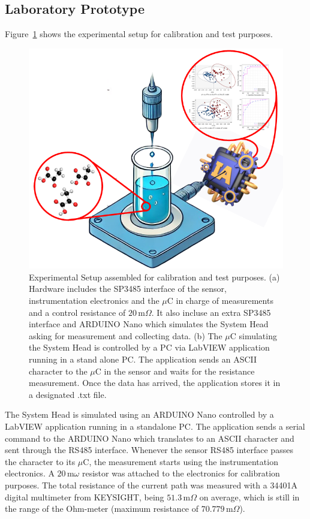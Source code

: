 \documentclass[journal,twoside,web]{ieeecolor}
\begin{document}
\subsection{Laboratory Prototype}
\label{ssec:labProto}
Figure~\ref{fig:measSet} shows the experimental setup for calibration and test purposes.
\begin{figure}
\centering
\includegraphics [trim = 0mm 50mm 0mm 0mm, clip, width=1\textwidth]{figures/fig0.png}
\caption{Experimental Setup assembled for calibration and test purposes. (a) Hardware includes the SP3485 interface of the sensor, instrumentation electronics and the $\mu$C in charge of measurements and a control resistance of $20$\,m$\Omega$. It also incluse an extra SP3485 interface and ARDUINO Nano which simulates the System Head asking for measurement and collecting data. (b) The $\mu$C simulating the System Head is controlled by a PC via LabVIEW application running in a stand alone PC. The application sends an ASCII character to the $\mu$C in the sensor and waits for the resistance measurement. Once the data has arrived, the application stores it in a designated .txt file.}
\label{fig:measSet}
\end{figure}
The System Head is simulated using an ARDUINO Nano controlled by a LabVIEW application running in a standalone PC. The application sends a serial command to the ARDUINO Nano which translates to an ASCII character and sent through the RS485 interface. Whenever the sensor RS485 interface passes the character to its $\mu$C, the measurement starts using the instrumentation electronics. A $20$\,m$\omega$ resistor was attached to the electronics for calibration purposes. The total resistance of the current path was measured with a 34401A digital multimeter from KEYSIGHT, being $51.3$\,m$\Omega$ on average, which is still in the range of the Ohm-meter (maximum resistance of $70.779$\,m$\Omega$).
\end{document}
